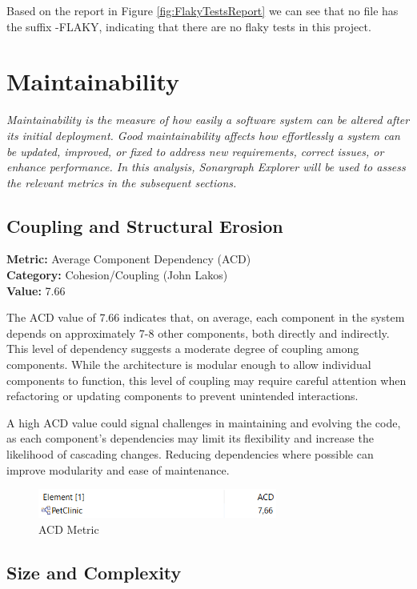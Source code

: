 \documentclass[a4paper,11pt,openright,BCOR=15mm]{scrbook}
\begin{document}
	Based on the report in Figure \ref{fig:FlakyTestsReport} we can see that no file has the suffix -FLAKY, indicating that there are no flaky tests in this project.
	\chapter{Maintainability}
\textit{Maintainability is the measure of how easily a software system can be altered after its initial deployment. Good maintainability affects how effortlessly a system can be updated, improved, or fixed to address new requirements, correct issues, or enhance performance. In this analysis, Sonargraph Explorer will be used to assess the relevant metrics in the subsequent sections. }
	

\section{Coupling and Structural Erosion}

\textbf{Metric:} Average Component Dependency (ACD) \\
\textbf{Category:} Cohesion/Coupling (John Lakos) \\
\textbf{Value:} 7.66

The ACD value of 7.66 indicates that, on average, each component in the system depends on approximately 7-8 other components, both directly and indirectly. This level of dependency suggests a moderate degree of coupling among components. While the architecture is modular enough to allow individual components to function, this level of coupling may require careful attention when refactoring or updating components to prevent unintended interactions.

A high ACD value could signal challenges in maintaining and evolving the code, as each component's dependencies may limit its flexibility and increase the likelihood of cascading changes. Reducing dependencies where possible can improve modularity and ease of maintenance.

\begin{figure}[H]
	\centering
	\includegraphics[width=0.7\textwidth]{figs/Maintainability/ACD.png}
	\caption{ACD Metric}
	\label{fig:ACD}
  \end{figure}

\section{Size and Complexity}
\end{document}
